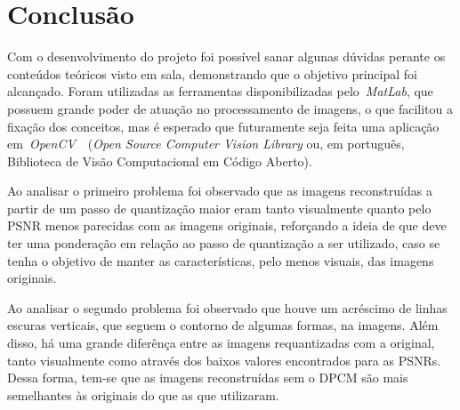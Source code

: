 \documentclass[conference]{Trabalho_3}
\begin{document}
\section{Conclus\~ao}
  \label{conclusao}
Com o desenvolvimento do projeto foi poss\'ivel sanar algunas d\'uvidas perante os conte\'udos te\'oricos visto em sala, demonstrando que o objetivo principal foi alcan\c{c}ado. Foram utilizadas as ferramentas disponibilizadas pelo~\textit{MatLab}, que possuem grande poder de atua\c{c}\~ao no processamento de imagens, o que facilitou a fixa\c{c}\~ao dos conceitos, mas \'e esperado que futuramente seja feita uma aplica\c{c}\~ao em~\textit{OpenCV}~\cite{opencv}~(\textit{Open Source Computer Vision Library} ou, em portugu\^es, Biblioteca de Vis\~ao Computacional em C\'odigo Aberto).

Ao analisar o primeiro problema foi observado que as imagens reconstru\'idas a partir de um passo de quantiza\c{c}\~ao maior eram tanto visualmente quanto pelo PSNR menos parecidas com as imagens originais, refor\c{c}ando a ideia de que deve ter uma pondera\c{c}\~ao em rela\c{c}\~ao ao passo de quantiza\c{c}\~ao a ser utilizado, caso se tenha o objetivo de manter as caracter\'isticas, pelo menos visuais, das imagens originais.

Ao analisar o segundo problema foi observado que houve um acr\'escimo de linhas escuras verticais, que seguem o contorno de algumas formas, na imagens. Al\'em disso, h\'a uma grande difer\^en\c{c}a entre as imagens requantizadas com a original, tanto visualmente como atrav\'es dos baixos valores encontrados para as PSNRs. Dessa forma, tem-se que as imagens reconstru\'idas sem o DPCM s\~ao mais semelhantes \`as originais do que as que utilizaram.




\end{document}
